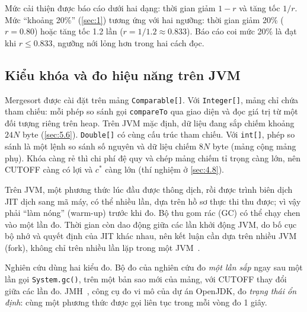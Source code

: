 \documentclass[12pt,a4paper]{article}
\begin{document}
Mức cải thiện được báo cáo dưới hai dạng: thời gian giảm $1 - r$ và tăng tốc $1/r$. Mức ``khoảng 20\%'' (\cref{sec:1}) tương ứng với hai ngưỡng: thời gian giảm 20\% ($r = 0.80$) hoặc tăng tốc 1.2 lần ($r = 1/1.2 \approx 0.833$). Báo cáo coi mức 20\% là đạt khi $r \le 0.833$, ngưỡng nới lỏng hơn trong hai cách đọc.

\subsection{Kiểu khóa và đo hiệu năng trên JVM}\label{sec:2.8}\label{sec:2.9}
Mergesort được cài đặt trên mảng \texttt{Comparable[]}. Với \texttt{Integer[]}, mảng chỉ chứa tham chiếu: mỗi phép so sánh gọi \texttt{compareTo} qua giao diện và đọc giá trị từ một đối tượng riêng trên heap. Trên JVM mặc định, dữ liệu đang sắp chiếm khoảng $24N$ byte (\cref{sec:5.6}). \texttt{Double[]} có cùng cấu trúc tham chiếu. Với \texttt{int[]}, phép so sánh là một lệnh so sánh số nguyên và dữ liệu chiếm $8N$ byte (mảng cộng mảng phụ). Khóa càng rẻ thì chi phí đệ quy và chép mảng chiếm tỉ trọng càng lớn, nên CUTOFF càng có lợi và $c^*$ càng lớn (thí nghiệm ở \cref{sec:4.8}).

Trên JVM, một phương thức lúc đầu được thông dịch, rồi được trình biên dịch JIT dịch sang mã máy, có thể nhiều lần, dựa trên hồ sơ thực thi thu được; vì vậy phải ``làm nóng'' (warm-up) trước khi đo. Bộ thu gom rác (GC) có thể chạy chen vào một lần đo. Thời gian còn dao động giữa các lần khởi động JVM, do bố cục bộ nhớ và quyết định của JIT khác nhau, nên kết luận cần dựa trên nhiều JVM (fork), không chỉ trên nhiều lần lặp trong một JVM~\citep{georges2007,kalibera2013}.

Nghiên cứu dùng hai kiểu đo. Bộ đo của nghiên cứu đo \emph{một lần sắp} ngay sau một lần gọi \texttt{System.gc()}, trên một bản sao mới của mảng, với CUTOFF thay đổi giữa các lần đo. JMH~\citep{jmh}, công cụ đo vi mô của dự án OpenJDK, đo \emph{trạng thái ổn định}: cùng một phương thức được gọi liên tục trong mỗi vòng đo 1 giây.
\end{document}
